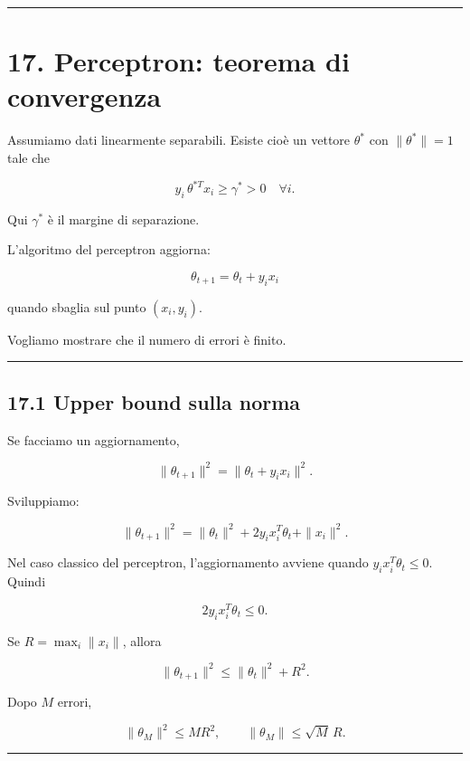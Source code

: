 \documentclass{article}
\begin{document}
\begin{center}\rule{0.5\linewidth}{0.5pt}\end{center}

\section{17. Perceptron: teorema di
convergenza}\label{perceptron-teorema-di-convergenza}

Assumiamo dati linearmente separabili. Esiste cioè un vettore
\(\theta^*\) con \(\|\theta^*\|=1\) tale che

\[
y_i\,\theta^{*T}x_i \ge \gamma^* > 0
\quad\forall i.
\]

Qui \(\gamma^*\) è il margine di separazione.

L'algoritmo del perceptron aggiorna:

\[
\theta_{t+1}=\theta_t+y_i x_i
\]

quando sbaglia sul punto \((x_i,y_i)\).

Vogliamo mostrare che il numero di errori è finito.

\begin{center}\rule{0.5\linewidth}{0.5pt}\end{center}

\subsection{17.1 Upper bound sulla norma}\label{upper-bound-sulla-norma}

Se facciamo un aggiornamento,

\[
\|\theta_{t+1}\|^2
=
\|\theta_t + y_i x_i\|^2.
\]

Sviluppiamo:

\[
\|\theta_{t+1}\|^2
=
\|\theta_t\|^2 + 2y_i x_i^T\theta_t + \|x_i\|^2.
\]

Nel caso classico del perceptron, l'aggiornamento avviene quando
\(y_ix_i^T\theta_t\le 0\). Quindi

\[
2y_i x_i^T\theta_t \le 0.
\]

Se \(R=\max_i \|x_i\|\), allora

\[
\|\theta_{t+1}\|^2 \le \|\theta_t\|^2 + R^2.
\]

Dopo \(M\) errori,

\[
\|\theta_M\|^2 \le M R^2,
\qquad
\|\theta_M\|\le \sqrt{M}\,R.
\]

\begin{center}\rule{0.5\linewidth}{0.5pt}\end{center}
\end{document}
